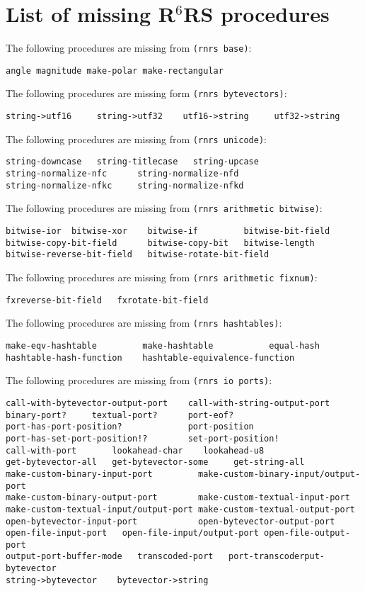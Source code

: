 \documentclass[onecolumn, 12pt, twoside, openright, dvipdfm]{book}
\newcommand{\rnrs}[1]{R$^{\mathrm{#1}}$RS}
\begin{document}
\section{List of missing \rnrs{6} procedures}

The following procedures are missing from \texttt{(rnrs base)}:
\begin{Verbatim}
angle magnitude make-polar make-rectangular
\end{Verbatim}

The following procedures are missing form \texttt{(rnrs bytevectors)}:
\begin{Verbatim}
string->utf16     string->utf32    utf16->string     utf32->string
\end{Verbatim}


The following procedures are missing from \texttt{(rnrs unicode)}:
\begin{Verbatim}
string-downcase   string-titlecase   string-upcase    
string-normalize-nfc      string-normalize-nfd 
string-normalize-nfkc     string-normalize-nfkd   
\end{Verbatim}


The following procedures are missing from \texttt{(rnrs arithmetic
bitwise)}:
\begin{Verbatim}
bitwise-ior  bitwise-xor    bitwise-if         bitwise-bit-field 
bitwise-copy-bit-field      bitwise-copy-bit   bitwise-length  
bitwise-reverse-bit-field   bitwise-rotate-bit-field  
\end{Verbatim}


The following procedures are missing from \texttt{(rnrs arithmetic
fixnum)}:
\begin{Verbatim}
fxreverse-bit-field   fxrotate-bit-field   
\end{Verbatim}


The following procedures are missing from \texttt{(rnrs hashtables)}:
\begin{Verbatim}
make-eqv-hashtable         make-hashtable           equal-hash
hashtable-hash-function    hashtable-equivalence-function 
\end{Verbatim}



The following procedures are missing from \texttt{(rnrs io ports)}:
\begin{Verbatim}
call-with-bytevector-output-port    call-with-string-output-port
binary-port?     textual-port?      port-eof?
port-has-port-position?             port-position 
port-has-set-port-position!?        set-port-position!
call-with-port       lookahead-char    lookahead-u8
get-bytevector-all   get-bytevector-some     get-string-all
make-custom-binary-input-port         make-custom-binary-input/output-port    
make-custom-binary-output-port        make-custom-textual-input-port    
make-custom-textual-input/output-port make-custom-textual-output-port
open-bytevector-input-port            open-bytevector-output-port 
open-file-input-port   open-file-input/output-port open-file-output-port    
output-port-buffer-mode   transcoded-port   port-transcoderput-bytevector 
string->bytevector    bytevector->string
\end{Verbatim}




\nocite{ghuloum-implicit}
\nocite{ghuloum-generation}

\backmatter
\appendix


\printindex
\end{document}
